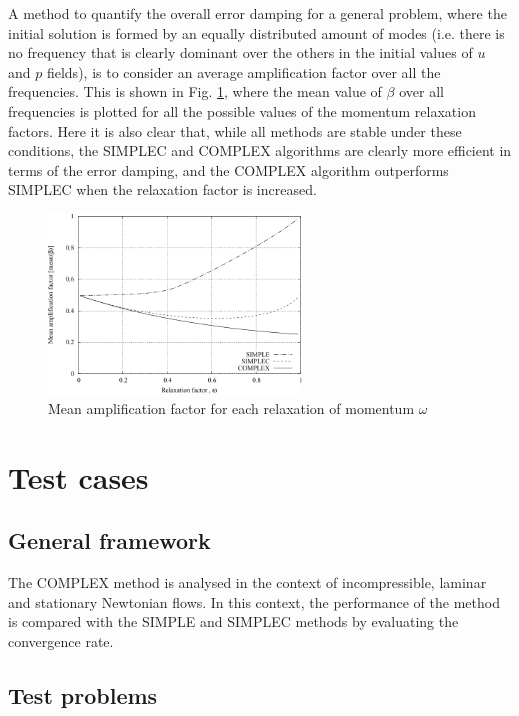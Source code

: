 \documentclass[final,3p,times,11pt,onecolumn]{myElsarticle}
\numberwithin{equation}{section}
\begin{document}
A method to quantify the overall error damping for a general problem, where the initial solution is formed by an equally distributed amount of modes (i.e. there is no frequency that is clearly dominant over the others in the initial values of $u$ and $p$ fields), is to consider an average amplification factor over all the frequencies. This is shown in Fig. \ref{fig:1d}, where the mean value of $\beta$ over all frequencies is plotted for all the possible values of the momentum relaxation factors. Here it is also clear that, while all methods are stable under these conditions, the SIMPLEC and COMPLEX algorithms are clearly more efficient in terms of the error damping, and the COMPLEX algorithm outperforms SIMPLEC when the relaxation factor is increased. 

\begin{figure}[H]
    \centering
    \includegraphics[width=0.6\textwidth]{fig/meanAmp}
    \caption{Mean amplification factor for each relaxation of momentum $\omega$}
    \label{fig:1d}
\end{figure}  

\section{Test cases}
\label{sec:cases}

\subsection{General framework}
The COMPLEX method is analysed in the context of incompressible, laminar and stationary Newtonian flows. In this context, the performance of the method is compared with the SIMPLE and SIMPLEC methods by evaluating the convergence rate.

\subsection{Test problems}\label{Section:problemDescription}
 
\end{document}
